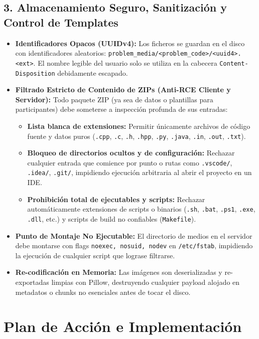 \documentclass[11pt,a4paper]{article}
\begin{document}
\subsection{3. Almacenamiento Seguro, Sanitización y Control de Templates}
\begin{itemize}
    \item \textbf{Identificadores Opacos (UUIDv4):} Los ficheros se guardan en el disco con identificadores aleatorios: \texttt{problem\_media/\textless problem\_code\textgreater/\textless uuid4\textgreater.\textless ext\textgreater}. El nombre legible del usuario solo se utiliza en la cabecera \texttt{Content-Disposition} debidamente escapado.
    \item \textbf{Filtrado Estricto de Contenido de ZIPs (Anti-RCE Cliente y Servidor):} Todo paquete ZIP (ya sea de datos o plantillas para participantes) debe someterse a inspección profunda de sus entradas:
    \begin{itemize}
        \item \textbf{Lista blanca de extensiones:} Permitir únicamente archivos de código fuente y datos puros (\texttt{.cpp}, \texttt{.c}, \texttt{.h}, \texttt{.hpp}, \texttt{.py}, \texttt{.java}, \texttt{.in}, \texttt{.out}, \texttt{.txt}).
        \item \textbf{Bloqueo de directorios ocultos y de configuración:} Rechazar cualquier entrada que comience por punto o rutas como \texttt{.vscode/}, \texttt{.idea/}, \texttt{.git/}, impidiendo ejecución arbitraria al abrir el proyecto en un IDE.
        \item \textbf{Prohibición total de ejecutables y scripts:} Rechazar automáticamente extensiones de scripts o binarios (\texttt{.sh}, \texttt{.bat}, \texttt{.ps1}, \texttt{.exe}, \texttt{.dll}, etc.) y scripts de build no confiables (\texttt{Makefile}).
    \end{itemize}
    \item \textbf{Punto de Montaje No Ejecutable:} El directorio de medios en el servidor debe montarse con flags \texttt{noexec, nosuid, nodev} en \texttt{/etc/fstab}, impidiendo la ejecución de cualquier script que lograse filtrarse.
    \item \textbf{Re-codificación en Memoria:} Las imágenes son deserializadas y re-exportadas limpias con Pillow, destruyendo cualquier payload alojado en metadatos o chunks no esenciales antes de tocar el disco.
\end{itemize}

\section{Plan de Acción e Implementación}
\end{document}
